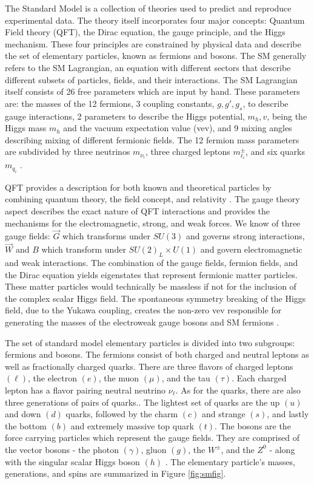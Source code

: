 The Standard Model is a collection of theories used to predict and reproduce experimental data. The theory itself incorporates four major concepts: Quantum Field theory (QFT), the Dirac equation, the gauge principle, and the Higgs mechanism. These four principles are constrained by physical data and describe the set of elementary particles, known as fermions and bosons. The SM generally refers to the SM Lagrangian, an equation with different sectors that describe different subsets of particles, fields, and their interactions. The SM Lagrangian itself consists of 26 free parameters which are input by hand. These parameters are: the masses of the 12 fermions, 3 coupling constants, $g, g', g_s$, to describe gauge interactions,  2 parameters to describe the Higgs potential, $m_h, v$, being the Higgs mass $m_h$ and the vacuum expectation value (vev), and 9 mixing angles describing mixing of different fermionic fields. The 12 fermion mass parameters are subdivided by three neutrinos $m_{\nu_i}$, three charged leptons $m_{\ell_i}^\pm$, and six quarks $m_{q_i}$ \cite{Thomson:2013zua}.

QFT provides a description for both known and theoretical particles by combining quantum theory, the field concept, and relativity \cite{Peskin:1995ev}. The gauge theory aspect describes the exact nature of QFT interactions and provides the mechanisms for the electromagnetic, strong, and weak forces.  We know of three gauge fields:  $\vec{G}$ which transforms under $SU(3)$ and governs strong interactions, $\vec{W}$ and $B$ which transform under $SU(2)_L \times U(1)$ and govern electromagnetic and weak interactions. The combination of the gauge fields, fermion fields, and the Dirac equation yields eigenstates that represent fermionic matter particles. These matter particles would technically be massless if not for the inclusion of the complex scalar Higgs field.  The spontaneous symmetry breaking of the Higgs field, due to the Yukawa coupling, creates the non-zero vev responsible for generating the masses of the electroweak gauge bosons and SM fermions \cite{Higgs:1966ev}\cite{Bernardi:2008zz}.

The set of standard model elementary particles is divided into two subgroups: fermions and bosons.  The fermions consist of both charged and neutral leptons as well as fractionally charged quarks. There are three flavors of charged leptons $(\ell)$, the electron $(e)$, the muon $(\mu)$, and the tau $(\tau)$. Each charged lepton has a flavor pairing neutral neutrino $\nu_\ell$.  As for the quarks, there are also three generations of pairs of quarks.. The lightest set of quarks are the up $(u)$ and down $(d)$ quarks, followed by the charm $(c)$ and strange $(s)$, and lastly the bottom $(b)$ and extremely massive top quark $(t)$.  The bosons are the force carrying particles which represent the gauge fields. They are comprised of the vector bosons - the photon $(\gamma)$, gluon $(g)$, the $W^\pm$, and the $Z^0$ - along with the singular scalar Higgs boson $(h)$ \cite{ParticleDataGroup:2020ssz}. The elementary particle's masses, generations, and spins are summarized in Figure \ref{fig:smfig}.

